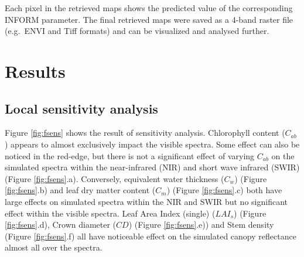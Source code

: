 \documentclass[a4paper, twoside]{templates/ociamthesis}
\begin{document}
Each pixel in the retrieved maps shows the predicted value of the corresponding INFORM parameter. The final retrieved maps were saved as a 4-band raster file (e.g.~ENVI and Tiff formats) and can be visualized and analysed further.

\hypertarget{results}{%
\chapter{Results}\label{results}}

\hypertarget{local-sensitivity-analysis-1}{%
\section{Local sensitivity analysis}\label{local-sensitivity-analysis-1}}

Figure \ref{fig:fsens} shows the result of sensitivity analysis. Chlorophyll content (\(C_{ab}\)) appears to almost exclusively impact the visible spectra. Some effect can also be noticed in the red-edge, but there is not a significant effect of varying \(C_{ab}\) on the simulated spectra within the near-infrared (NIR) and short wave infrared (SWIR) (Figure \ref{fig:fsens}.a). Conversely, equivalent water thickness (\(C_{w}\)) (Figure \ref{fig:fsens}.b) and leaf dry matter content (\(C_{m}\)) (Figure \ref{fig:fsens}.c) both have large effects on simulated spectra within the NIR and SWIR but no significant effect within the visible spectra. Leaf Area Index (single) (\(LAI_{s}\)) (Figure \ref{fig:fsens}.d), Crown diameter (\(CD\)) (Figure \ref{fig:fsens}.e)) and Stem density (Figure \ref{fig:fsens}.f) all have noticeable effect on the simulated canopy reflectance almost all over the spectra.

\newpage
\end{document}

